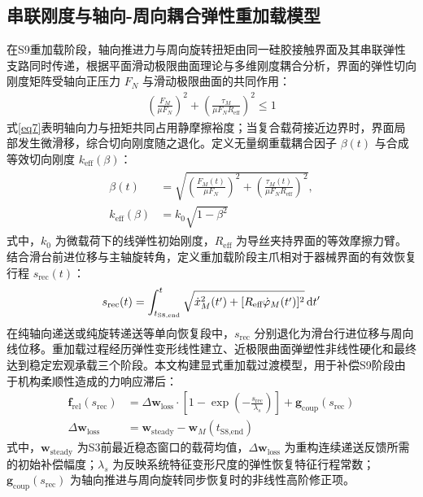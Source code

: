\documentclass{JQRnew}
\begin{document}
\begin{figure}[h!t]
	\centering
	\label{fig2}
\end{figure}

\subsection{串联刚度与轴向-周向耦合弹性重加载模型}

在S9重加载阶段，轴向推进力与周向旋转扭矩由同一硅胶接触界面及其串联弹性支路同时传递，根据平面滑动极限曲面理论与多维刚度耦合分析，界面的弹性切向刚度矩阵受轴向正压力 $F_N$ 与滑动极限曲面的共同作用：
\begin{align}
	\label{eq7}
	\left(\frac{F_M}{\mu F_N}\right)^2 + \left(\frac{\tau_M}{\mu F_N R_{\text{eff}}}\right)^2 \le 1
\end{align}
式\eqref{eq7}表明轴向力与扭矩共同占用静摩擦裕度；当复合载荷接近边界时，界面局部发生微滑移，综合切向刚度随之退化。定义无量纲重载耦合因子 $\beta(t)$ 与合成等效切向刚度 $k_{\text{eff}}(\beta)$：
\begin{align}
	\label{eq8}
	\begin{aligned}
		\beta(t) &= \sqrt{\left(\frac{F_M(t)}{\mu F_N}\right)^2 + \left(\frac{\tau_M(t)}{\mu F_N R_{\text{eff}}}\right)^2}, \\
		k_{\text{eff}}(\beta) &= k_0 \sqrt{1 - \beta^2}
	\end{aligned}
\end{align}
式中，$k_0$ 为微载荷下的线弹性初始刚度，$R_{\text{eff}}$ 为导丝夹持界面的等效摩擦力臂。结合滑台前进位移与主轴旋转角，定义重加载阶段主爪相对于器械界面的有效恢复行程 $s_{\text{rec}}(t)$：
\begin{align}
	\label{eq9}
	s_{\text{rec}}(t) = \int_{t_{\text{S8,end}}}^{t} \sqrt{\dot{x}_M^2(t') + [R_{\text{eff}}\dot{\varphi}_M(t')]^2}\,{\rm d}t'
\end{align}
在纯轴向递送或纯旋转递送等单向恢复段中，$s_{\text{rec}}$ 分别退化为滑台行进位移与周向线位移。重加载过程经历弹性变形线性建立、近极限曲面弹塑性非线性硬化和最终达到稳定宏观承载三个阶段。本文构建显式重加载过渡模型，用于补偿S9阶段由于机构柔顺性造成的力响应滞后：
\begin{align}
	\label{eq10}
	\bm{f}_{\text{rel}}(s_{\text{rec}}) &= \Delta\bm{w}_{\text{loss}} \cdot \left[1 - \exp\left(-\frac{s_{\text{rec}}}{\lambda_s}\right)\right] + \bm{g}_{\text{coup}}(s_{\text{rec}}) \\
	\label{eq11}
	\Delta\bm{w}_{\text{loss}} &= \bm{w}_{\text{steady}} - \bm{w}_M(t_{\text{S8,end}})
\end{align}
式中，$\bm{w}_{\text{steady}}$ 为S3前最近稳态窗口的载荷均值，$\Delta\bm{w}_{\text{loss}}$ 为重构连续递送反馈所需的初始补偿幅度；$\lambda_s$ 为反映系统特征变形尺度的弹性恢复特征行程常数；$\bm{g}_{\text{coup}}(s_{\text{rec}})$ 为轴向推进与周向旋转同步恢复时的非线性高阶修正项。
\end{document}
